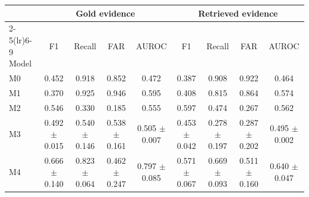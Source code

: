 \begin{tabular}{@{}lcccccccc@{}}
\toprule
 & \multicolumn{4}{c}{Gold evidence} & \multicolumn{4}{c}{Retrieved evidence} \\
\cmidrule(lr){2-5}\cmidrule(lr){6-9}
Model & F1 & Recall & FAR & AUROC & F1 & Recall & FAR & AUROC \\
\midrule
M0 & 0.452 & 0.918 & 0.852 & 0.472 & 0.387 & 0.908 & 0.922 & 0.464 \\
M1 & 0.370 & 0.925 & 0.946 & 0.595 & 0.408 & 0.815 & 0.864 & 0.574 \\
M2 & 0.546 & 0.330 & 0.185 & 0.555 & 0.597 & 0.474 & 0.267 & 0.562 \\
M3 & 0.492 $\pm$ 0.015 & 0.540 $\pm$ 0.146 & 0.538 $\pm$ 0.161 & 0.505 $\pm$ 0.007 & 0.453 $\pm$ 0.042 & 0.278 $\pm$ 0.197 & 0.287 $\pm$ 0.202 & 0.495 $\pm$ 0.002 \\
M4 & 0.666 $\pm$ 0.140 & 0.823 $\pm$ 0.064 & 0.462 $\pm$ 0.247 & 0.797 $\pm$ 0.085 & 0.571 $\pm$ 0.067 & 0.669 $\pm$ 0.093 & 0.511 $\pm$ 0.160 & 0.640 $\pm$ 0.047 \\
\bottomrule
\end{tabular}